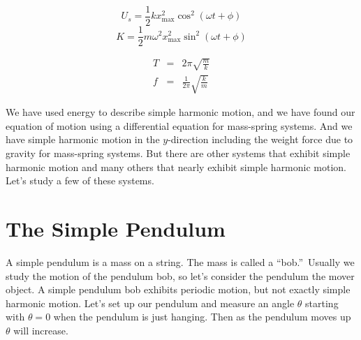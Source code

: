 \documentclass{book}
\begin{document}
\begin{equation*}
U_{s}=\frac{1}{2}kx_{\max }^{2}\cos ^{2}\left( \omega t+\phi \right)
\end{equation*}%
\begin{equation*}
K=\frac{1}{2}m\omega ^{2}x_{\max }^{2}\sin ^{2}\left( \omega t+\phi \right)
\end{equation*}

\begin{eqnarray}
T &=&2\pi \sqrt{\frac{m}{k}} \\
f &=&\frac{1}{2\pi }\sqrt{\frac{k}{m}}
\end{eqnarray}

We have used energy to describe simple harmonic motion, and we have found
our equation of motion using a differential equation for mass-spring
systems. And we have simple harmonic motion in the $y$-direction including
the weight force due to gravity for mass-spring systems. But there are other
systems that exhibit simple harmonic motion and many others that nearly
exhibit simple harmonic motion. Let's study a few of these systems.

\section{The Simple Pendulum}

A simple pendulum is a mass on a
string. The mass is called a \textquotedblleft bob.\textquotedblright\
Usually we study the motion of the pendulum bob, so let's consider the
pendulum the mover object. A simple pendulum bob exhibits periodic motion,
but not exactly simple harmonic motion. Let's set up our pendulum and
measure an angle $\theta $ starting with $\theta =0$ when the pendulum is
just hanging. Then as the pendulum moves up $\theta $ will increase.
\end{document}

